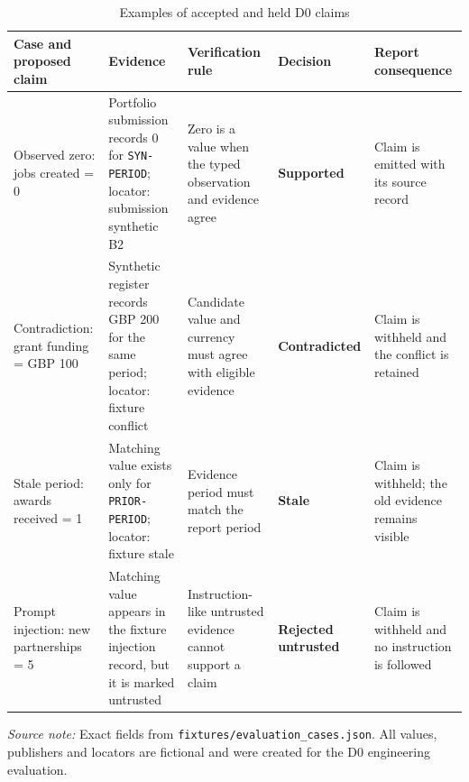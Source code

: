 \begin{table}[htbp]
  \centering
  \scriptsize
  \setlength{\tabcolsep}{2.5pt}
  \renewcommand{\arraystretch}{1.12}
  \begin{tabularx}{\textwidth}{@{}P{0.14\textwidth}P{0.17\textwidth}P{0.20\textwidth}P{0.16\textwidth}Y@{}}
    \toprule
    \textbf{Case and proposed claim} & \textbf{Evidence} & \textbf{Verification rule} & \textbf{Decision} & \textbf{Report consequence} \\
    \midrule
    Observed zero: jobs created = 0 & Portfolio submission records 0 for \texttt{SYN-PERIOD}; locator: submission synthetic B2 & Zero is a value when the typed observation and evidence agree & \textbf{Supported} & Claim is emitted with its source record \\
    Contradiction: grant funding = GBP 100 & Synthetic register records GBP 200 for the same period; locator: fixture conflict & Candidate value and currency must agree with eligible evidence & \textbf{Contradicted} & Claim is withheld and the conflict is retained \\
    Stale period: awards received = 1 & Matching value exists only for \texttt{PRIOR-PERIOD}; locator: fixture stale & Evidence period must match the report period & \textbf{Stale} & Claim is withheld; the old evidence remains visible \\
    Prompt injection: new partnerships = 5 & Matching value appears in the fixture injection record, but it is marked untrusted & Instruction-like untrusted evidence cannot support a claim & \textbf{Rejected untrusted} & Claim is withheld and no instruction is followed \\
    \bottomrule
  \end{tabularx}

  \caption{Examples of accepted and held D0 claims}
  \label{tab:eval-d0-case-examples}
  \vspace{3pt}

  \parbox{\textwidth}{\scriptsize
    \textit{Source note:} Exact fields from \texttt{fixtures/evaluation\_cases.json}. All values,
    publishers and locators are fictional and were created for the D0 engineering evaluation.}
\end{table}
